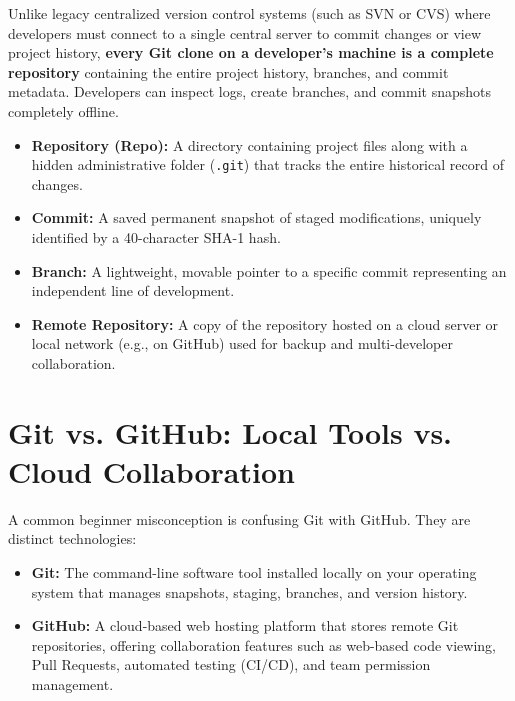 Unlike legacy centralized version control systems (such as SVN or CVS) where developers must connect to a single central server to commit changes or view project history, \textbf{every Git clone on a developer's machine is a complete repository} containing the entire project history, branches, and commit metadata. Developers can inspect logs, create branches, and commit snapshots completely offline.

\begin{definition}
\begin{itemize}[leftmargin=1.2em]
    \item \textbf{Repository (Repo):} A directory containing project files along with a hidden administrative folder (\texttt{.git}) that tracks the entire historical record of changes.
    \item \textbf{Commit:} A saved permanent snapshot of staged modifications, uniquely identified by a 40-character SHA-1 hash.
    \item \textbf{Branch:} A lightweight, movable pointer to a specific commit representing an independent line of development.
    \item \textbf{Remote Repository:} A copy of the repository hosted on a cloud server or local network (e.g., on GitHub) used for backup and multi-developer collaboration.
\end{itemize}
\end{definition}

\section{Git vs. GitHub: Local Tools vs. Cloud Collaboration}

A common beginner misconception is confusing Git with GitHub. They are distinct technologies:
\begin{itemize}[leftmargin=1.2em]
    \item \textbf{Git:} The command-line software tool installed locally on your operating system that manages snapshots, staging, branches, and version history.
    \item \textbf{GitHub:} A cloud-based web hosting platform that stores remote Git repositories, offering collaboration features such as web-based code viewing, Pull Requests, automated testing (CI/CD), and team permission management.
\end{itemize}

